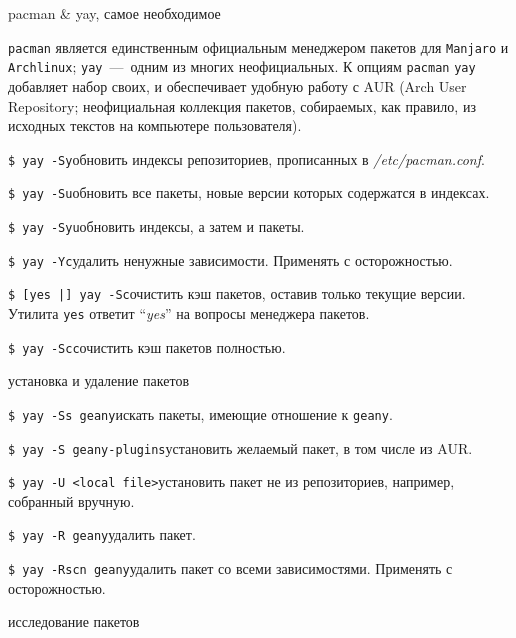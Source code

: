 \documentclass[
a4paper
,11pt
,landscape
,russian
,twocolumn
]{letter}
\newcommand\hsp{\hspace{.2in}}
\newcommand\vsp{\vspace{.2in}}
\begin{document}
\thispagestyle{empty}

\begin{Large}
    pacman \& yay, самое необходимое
\end{Large}

\vsp

\texttt{pacman} является единственным официальным менеджером пакетов для
\texttt{Manjaro} и \texttt{Archlinux}; \texttt{yay}~---~одним из многих
неофициальных.
К опциям \texttt{pacman} \texttt{yay} добавляет набор своих, и обеспечивает
удобную работу с AUR (Arch User Repository; неофициальная коллекция пакетов,
собираемых, как правило, из исходных текстов на компьютере пользователя).

\texttt{\$ yay -Sy}\hsp обновить индексы репозиториев, прописанных в
\textit{/etc/pacman.conf}.

\texttt{\$ yay -Su}\hsp обновить все пакеты, новые версии которых
содержатся в индексах.

\texttt{\$ yay -Syu}\hsp обновить индексы, а затем и пакеты.

\texttt{\$ yay -Yc}\hsp удалить ненужные зависимости. Применять
с осторожностью.

\texttt{\$ [yes |] yay -Sc}\hsp очистить кэш пакетов, оставив только
текущие версии. Утилита \texttt{yes} ответит ``\textit{yes}'' на вопросы
менеджера пакетов.

\texttt{\$ yay -Scc}\hsp очистить кэш пакетов полностью.

\vsp

\begin{Large}
установка и удаление пакетов
\end{Large}

\vsp

\texttt{\$ yay -Ss geany}\hsp искать пакеты, имеющие отношение к
\texttt{geany}.

\texttt{\$ yay -S geany-plugins}\hsp установить желаемый пакет, в том
числе из AUR.

\texttt{\$ yay -U <local file>}\hsp установить пакет не из репозиториев,
например, собранный вручную.

\texttt{\$ yay -R geany}\hsp удалить пакет.

\texttt{\$ yay -Rscn geany}\hsp удалить пакет со всеми зависимостями.
Применять с осторожностью.

\vsp

\begin{Large}
исследование пакетов
\end{Large}
\end{document}
